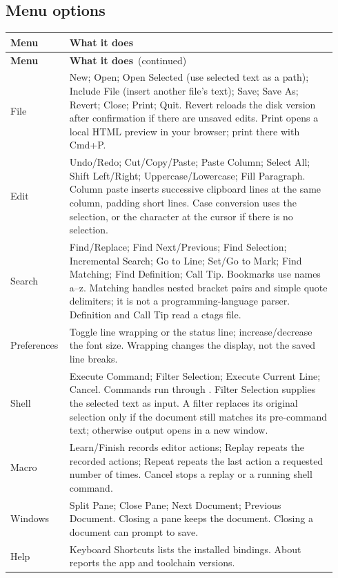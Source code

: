 \documentclass[11pt,letterpaper]{article}
\newcommand{\code}[1]{\texttt{\detokenize{#1}}}
\begin{document}
\subsection{Menu options}
\begin{longtable}{@{}P{0.15\linewidth}P{0.79\linewidth}@{}}
\toprule\textbf{Menu} & \textbf{What it does}\\\midrule\endfirsthead
\toprule\textbf{Menu} & \textbf{What it does}\ (continued)\\\midrule\endhead
File & New; Open; Open Selected (use selected text as a path); Include File (insert
another file's text); Save; Save As; Revert; Close; Print; Quit. Revert reloads the
disk version after confirmation if there are unsaved edits. Print opens a local
HTML preview in your browser; print there with Cmd+P.\\
Edit & Undo/Redo; Cut/Copy/Paste; Paste Column; Select All; Shift Left/Right;
Uppercase/Lowercase; Fill Paragraph. Column paste inserts successive clipboard
lines at the same column, padding short lines. Case conversion uses the selection,
or the character at the cursor if there is no selection.\\
Search & Find/Replace; Find Next/Previous; Find Selection; Incremental Search;
Go to Line; Set/Go to Mark; Find Matching; Find Definition; Call Tip. Bookmarks
use names a--z. Matching handles nested bracket pairs and simple quote delimiters;
it is not a programming-language parser. Definition and Call Tip read a ctags file.\\
Preferences & Toggle line wrapping or the status line; increase/decrease the font
size. Wrapping changes the display, not the saved line breaks.\\
Shell & Execute Command; Filter Selection; Execute Current Line; Cancel.
Commands run through \code{/bin/sh}. Filter Selection supplies the selected text
as input. A filter replaces its original selection only if the document still
matches its pre-command text; otherwise output opens in a new window.\\
Macro & Learn/Finish records editor actions; Replay repeats the recorded actions;
Repeat repeats the last action a requested number of times. Cancel stops a replay
or a running shell command.\\
Windows & Split Pane; Close Pane; Next Document; Previous Document. Closing a
pane keeps the document. Closing a document can prompt to save.\\
Help & Keyboard Shortcuts lists the installed bindings. About reports the app
and toolchain versions.\\
\bottomrule
\end{longtable}
\end{document}
